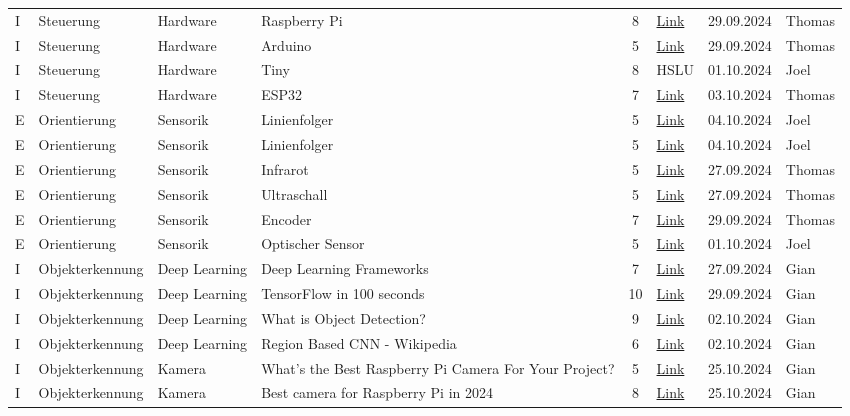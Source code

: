 \documentclass[../main.tex]{subfiles}
\begin{document}
\begin{longtable}{lp{2cm}p{2cm}p{4cm}clcl}
I & Steuerung & Hardware & Raspberry Pi & 8 & \href{https://www.raspberrypi.com/documentation/computers/raspberry-pi.html}{Link} & 29.09.2024 & Thomas
\tabularnewline
I & Steuerung & Hardware & Arduino & 5 & \href{https://arduino.cc/en/hardware#boards-1}{Link} & 29.09.2024 & Thomas
\tabularnewline
I & Steuerung & Hardware & Tiny & 8 & HSLU & 01.10.2024 & Joel
\tabularnewline
I & Steuerung & Hardware & ESP32 & 7 & \href{https://www.espressif.com/en/products/devkits/esp32-devkitc}{Link} & 03.10.2024 & Thomas
\tabularnewline
E & Orientierung & Sensorik & Linienfolger & 5 & \href{https://pglu.ch/3-mit-fahrroboter-linie-folgen/?srsltid=AfmBOor3qIbdXGD1WYtV-YadIVjE2Urm7U3QGtes_IjcCzCVViC2yody}{Link} & 04.10.2024 & Joel
\tabularnewline
E & Orientierung & Sensorik & Linienfolger & 5 & \href{https://spacehal.github.io/docs/robotik/edgeFollower}{Link} & 04.10.2024 & Joel
\tabularnewline
E & Orientierung & Sensorik & Infrarot & 5 & \href{https://www.elektronik-kompendium.de/sites/raspberry-pi/2802011.htm}{Link} & 27.09.2024 & Thomas
\tabularnewline
E & Orientierung & Sensorik & Ultraschall & 5 & \href{https://elektro.turanis.de/html/prj121/index.html}{Link} & 27.09.2024 & Thomas 
\tabularnewline
E & Orientierung & Sensorik & Encoder & 7 & \href{https://www.arrow.de/research-and-events/articles/rotary-encoders-how-to-pair-with-an-arduino-board}{Link} & 29.09.2024 & Thomas
\tabularnewline
E & Orientierung & Sensorik & Optischer Sensor & 5 & \href{https://global.sharp/products/device/lineup/data/pdf/datasheet/gp2y0e02a_e.pdf}{Link} & 01.10.2024 & Joel
\tabularnewline

I & Objekterkennung & Deep Learning & Deep Learning Frameworks & 7 &  \href{https://www.simplilearn.com/tutorials/deep-learning-tutorial/deep-learning-frameworks} {Link}&  27.09.2024 & Gian
\tabularnewline
I & Objekterkennung & Deep Learning & TensorFlow in 100 seconds & 10 &
\href{https://www.youtube.com/watch?v=i8NETqtGHms}{Link} & 29.09.2024 & Gian
\tabularnewline
I & Objekterkennung & Deep Learning & What is Object Detection? & 9 &
\href{https://www.ibm.com/topics/object-detection#:~:text=Object%20detection%20is%20a%20technique,imaging%20to%20self%2Ddriving%20cars.}{Link}
& 02.10.2024 & Gian
\tabularnewline
I & Objekterkennung & Deep Learning & Region Based CNN - Wikipedia & 6 &
\href{https://en.wikipedia.org/wiki/Region_Based_Convolutional_Neural_Networks}{Link}
& 02.10.2024 & Gian
\tabularnewline

I & Objekterkennung & Kamera & What’s the Best Raspberry Pi Camera For Your Project? & 5 &
\href{https://randomnerdtutorials.com/best-raspberry-pi-camera-for-your-project/}{Link}
& 25.10.2024 & Gian
\tabularnewline
I & Objekterkennung & Kamera & Best camera for Raspberry Pi in 2024 & 8 &
\href{https://www.xda-developers.com/best-camera-raspberry-pi/}{Link}
& 25.10.2024 & Gian
\tabularnewline


\end{longtable}
\end{document}
